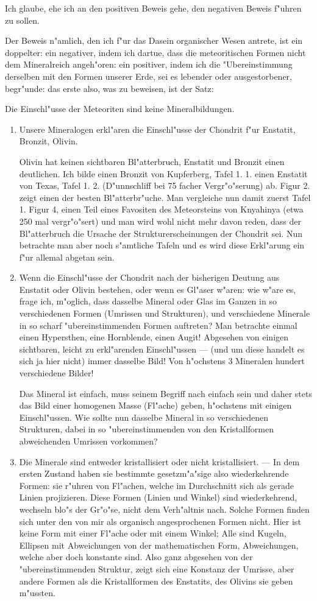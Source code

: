 \documentclass[a4paper, 11pt, oneside]{article}
\begin{document}
Ich glaube, ehe ich an den positiven Beweis gehe, den negativen Beweis f"uhren zu sollen.

Der Beweis n"amlich, den ich f"ur das Dasein organischer Wesen antrete, ist ein doppelter: ein negativer, indem ich dartue, dass die meteoritischen Formen nicht dem Mineralreich angeh"oren: ein positiver, indem ich die "Ubereinstimmung derselben mit den Formen unserer Erde, sei es lebender oder ausgestorbener, begr"unde: das erste also, was zu beweisen, ist der Satz:

Die Einschl"usse der Meteoriten sind keine Mineralbildungen.
\begin{enumerate}
\item Unsere Mineralogen erkl"aren die Einschl"usse der Chondrit f"ur Enstatit, Bronzit, Olivin.

Olivin hat keinen sichtbaren Bl"atterbruch, Enstatit und Bronzit einen deutlichen. Ich bilde einen Bronzit von Kupferberg, Tafel 1. 1. einen Enstatit von Texas, Tafel 1. 2. (D"unnschliff bei 75 facher Vergr"o"serung) ab. Figur 2. zeigt einen der besten Bl"atterbr"uche. Man vergleiche nun damit zuerst Tafel 1. Figur 4, einen Teil eines Favositen des Meteorsteins von Knyahinya (etwa 250 mal vergr"o"sert) und man wird wohl nicht mehr davon reden, dass der Bl"atterbruch die Ursache der Strukturerscheinungen der Chondrit sei. Nun betrachte man aber noch s"amtliche Tafeln und es wird diese Erkl"arung ein f"ur allemal abgetan sein.
\item Wenn die Einschl"usse der Chondrit nach der bisherigen Deutung aus Enstatit oder Olivin bestehen, oder wenn es Gl"aser w"aren: wie w"are es, frage ich, m"oglich, dass dasselbe Mineral oder Glas im Ganzen in so verschiedenen Formen (Umrissen und Strukturen), und verschiedene Minerale in so scharf "ubereinstimmenden Formen auftreten? Man betrachte einmal einen Hypersthen, eine Hornblende, einen Augit! Abgesehen von einigen sichtbaren, leicht zu erkl"arenden Einschl"ussen --- (und um diese handelt es sich ja hier nicht) immer dasselbe Bild! Von h"ochstens 3 Mineralen hundert verschiedene Bilder!

Das Mineral ist einfach, muss seinem Begriff nach einfach sein und daher stets das Bild einer homogenen Masse (Fl"ache) geben, h"ochstens mit einigen Einschl"ussen. Wie sollte nun dasselbe Mineral in so verschiedenen Strukturen, dabei in so "ubereinstimmenden von den Kristallformen abweichenden Umrissen vorkommen?
\item Die Minerale sind entweder kristallisiert oder nicht kristallisiert. --- In dem ersten Zustand haben sie bestimmte gesetzm"a"sige also wiederkehrende Formen: sie r"uhren von Fl"achen, welche im Durchschnitt sich als gerade Linien projizieren. Diese Formen (Linien und Winkel) sind wiederkehrend, wechseln blo"s der Gr"o"se, nicht dem Verh"altnis nach. Solche Formen finden sich unter den von mir als organisch angesprochenen Formen nicht. Hier ist keine Form mit einer Fl"ache oder mit einem Winkel; Alle sind Kugeln, Ellipsen mit Abweichungen von der mathematischen Form, Abweichungen, welche aber doch konstante sind. Also ganz abgesehen von der "ubereinstimmenden Struktur, zeigt sich eine Konstanz der Umrisse, aber andere Formen als die Kristallformen des Enstatits, des Olivins sie geben m"ussten.


\end{enumerate}
\end{document}
